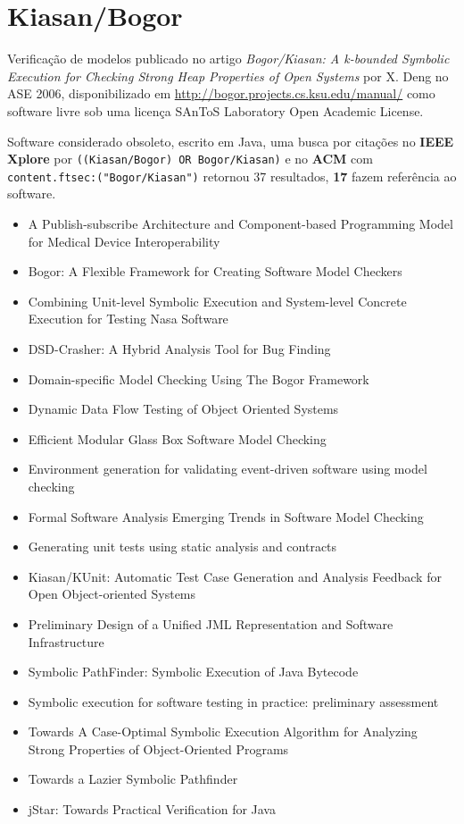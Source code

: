 \section{Kiasan/Bogor}

Verificação de modelos
publicado no artigo {\it Bogor/Kiasan: A k-bounded Symbolic Execution for Checking Strong Heap Properties of Open Systems}
por X. Deng
no ASE 2006,
disponibilizado em \url{http://bogor.projects.cs.ksu.edu/manual/}
como software livre
sob uma licença SAnToS Laboratory Open Academic License.

Software considerado obsoleto,
escrito em Java,
uma busca por citações no {\bf IEEE Xplore} por
\texttt{((Kiasan/Bogor) OR Bogor/Kiasan)}
e no {\bf ACM} com
\texttt{content.ftsec:("Bogor/Kiasan")}
retornou
37 resultados,
{\bf 17} fazem referência ao software.

\begin{itemize}
\item A Publish-subscribe Architecture and Component-based Programming Model for Medical Device Interoperability
\item Bogor: A Flexible Framework for Creating Software Model Checkers
\item Combining Unit-level Symbolic Execution and System-level Concrete Execution for Testing Nasa Software
\item DSD-Crasher: A Hybrid Analysis Tool for Bug Finding
\item Domain-specific Model Checking Using The Bogor Framework
\item Dynamic Data Flow Testing of Object Oriented Systems
\item Efficient Modular Glass Box Software Model Checking
\item Environment generation for validating event-driven software using model checking
\item Formal Software Analysis Emerging Trends in Software Model Checking
\item Generating unit tests using static analysis and contracts
\item Kiasan/KUnit: Automatic Test Case Generation and Analysis Feedback for Open Object-oriented Systems
\item Preliminary Design of a Unified JML Representation and Software Infrastructure
\item Symbolic PathFinder: Symbolic Execution of Java Bytecode
\item Symbolic execution for software testing in practice: preliminary assessment
\item Towards A Case-Optimal Symbolic Execution Algorithm for Analyzing Strong Properties of Object-Oriented Programs
\item Towards a Lazier Symbolic Pathfinder
\item jStar: Towards Practical Verification for Java
\end{itemize}

